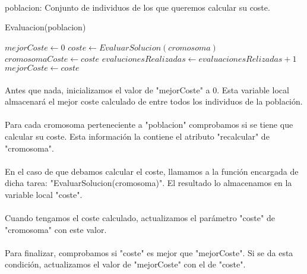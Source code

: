 	\paragraph{}poblacion: Conjunto de individuos de los que queremos calcular su coste.

	\begin{algorithm}[H]
		\caption{Evaluacion(poblacion)}
		\begin{algorithmic}
			\STATE $mejorCoste \leftarrow 0$
					\STATE $ coste \leftarrow EvaluarSolucion(cromosoma)$
					\STATE $ cromosomaCoste \leftarrow coste$
					\STATE $ evalucionesRealizadas \leftarrow evaluacionesRelizadas + 1$
						\STATE $ mejorCoste \leftarrow coste $
					\ENDIF 
				\ENDIF
			\ENDFOR
		\end{algorithmic}
	\end{algorithm}

	\paragraph{}Antes que nada, inicializamos el valor de "mejorCoste" a 0. Esta variable local almacenará el mejor coste calculado de entre todos los individuos de la población.
	
	\paragraph{}Para cada cromosoma perteneciente a "poblacion" comprobamos si se tiene que calcular su coste. Esta información la contiene el atributo "recalcular" de "cromosoma".
	
	\paragraph{}En el caso de que debamos calcular el coste, llamamos a la función encargada de dicha tarea: "EvaluarSolucion(cromosoma)". El resultado lo almacenamos en la variable local "coste".
	
	\paragraph{}Cuando tengamos el coste calculado, actualizamos el parámetro "coste" de "cromosoma"  con este valor.
	
	\paragraph{}Para finalizar, comprobamos si "coste" es mejor que "mejorCoste". Si se da esta condición, actualizamos el valor de "mejorCoste" con el de "coste".
	

